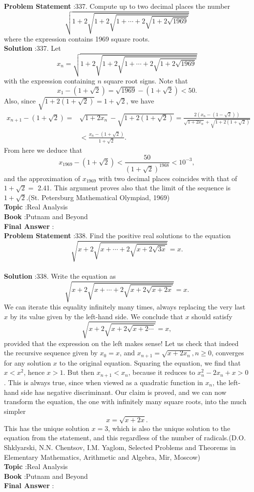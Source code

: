 \documentclass[10pt]{article}
\begin{document}
\textbf{Problem Statement} :337. Compute up to two decimal places the number$$ \sqrt{1+2 \sqrt{1+2 \sqrt{1+\cdots+2 \sqrt{1+2 \sqrt{1969}}}}} $$where the expression contains 1969 square roots.\\
\textbf{Solution} :337. Let$$ x_{n}=\sqrt{1+2 \sqrt{1+2 \sqrt{1+\cdots+2 \sqrt{1+2 \sqrt{1969}}}}} $$with the expression containing $n$ square root signs. Note that$$ x_{1}-(1+\sqrt{2})=\sqrt{1969}-(1+\sqrt{2})<50 . $$Also, since $\sqrt{1+2(1+\sqrt{2})}=1+\sqrt{2}$, we have $$ \begin{aligned} x_{n+1}-(1+\sqrt{2})=& \sqrt{1+2 x_{n}}-\sqrt{1+2(1+\sqrt{2})}=\frac{2\left(x_{n}-(1-\sqrt{2})\right)}{\sqrt{1+2 x_{n}}+\sqrt{1+2(1+\sqrt{2})}} \\ &<\frac{x_{n}-(1+\sqrt{2})}{1+\sqrt{2}} . \end{aligned} $$From here we deduce that$$ x_{1969}-(1+\sqrt{2})<\frac{50}{(1+\sqrt{2})^{1968}}<10^{-3}, $$and the approximation of $x_{1969}$ with two decimal places coincides with that of $1+\sqrt{2}=$ 2.41. This argument proves also that the limit of the sequence is $1+\sqrt{2}$.(St. Petersburg Mathematical Olympiad, 1969)\\
\textbf{Topic} :Real Analysis\\
\textbf{Book} :Putnam and Beyond\\
\textbf{Final Answer} :\\


\textbf{Problem Statement} :338. Find the positive real solutions to the equation$$ \sqrt{x+2 \sqrt{x+\cdots+2 \sqrt{x+2 \sqrt{3 x}}}}=x . $$\\
\textbf{Solution} :338. Write the equation as$$ \sqrt{x+2 \sqrt{x+\cdots+2 \sqrt{x+2 \sqrt{x+2 x}}}}=x . $$We can iterate this equality infinitely many times, always replacing the very last $x$ by its value given by the left-hand side. We conclude that $x$ should satisfy$$ \sqrt{x+2 \sqrt{x+2 \sqrt{x+2 \cdots}}}=x, $$provided that the expression on the left makes sense! Let us check that indeed the recursive sequence given by $x_{0}=x$, and $x_{n+1}=\sqrt{x+2 x_{n}}, n \geq 0$, converges for any solution $x$ to the original equation. Squaring the equation, we find that $x<x^{2}$, hence $x>1$. But then $x_{n+1}<x_{n}$, because it reduces to $x_{n}^{2}-2 x_{n}+x>0$. This is always true, since when viewed as a quadratic function in $x_{n}$, the left-hand side has negative discriminant. Our claim is proved, and we can now transform the equation, the one with infinitely many square roots, into the much simpler$$ x=\sqrt{x+2 x} . $$This has the unique solution $x=3$, which is also the unique solution to the equation from the statement, and this regardless of the number of radicals.(D.O. Shklyarski, N.N. Chentsov, I.M. Yaglom, Selected Problems and Theorems in Elementary Mathematics, Arithmetic and Algebra, Mir, Moscow)\\
\textbf{Topic} :Real Analysis\\
\textbf{Book} :Putnam and Beyond\\
\textbf{Final Answer} :\\
\end{document}
